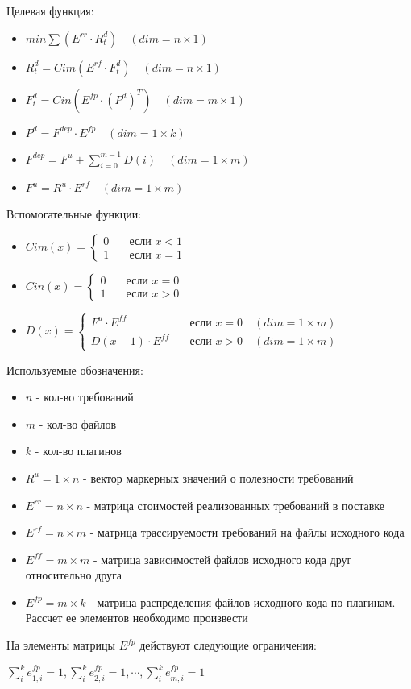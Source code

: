\documentclass{article}
\begin{document}
  \thispagestyle{empty}
  
  Целевая функция:
  \begin{itemize}
    \item[] $\displaystyle min \sum (E^{rr} \cdot R^{d}_{t}) \quad (dim = n \times 1)$
    \item[] $R^{d}_{t} = Cim(E^{rf} \cdot F^{d}_{t}) \quad (dim = n \times 1)$
    \item[] $F^{d}_{t} = Cin(E^{fp} \cdot (P^{d})^{T}) \quad (dim = m \times 1)$
    \item[] $P^{d} = F^{dep} \cdot E^{fp} \quad (dim = 1 \times k)$
    \item[] $\displaystyle F^{dep} = F^{u} + \sum^{m - 1}_{i = 0}D(i) \quad (dim = 1 \times m)$
    \item[] $F^{u} = R^{u} \cdot E^{rf} \quad (dim = 1 \times m)$
  \end{itemize}

  Вспомогательные функции:
  \begin{itemize}
    \item[] $
    Cim(x) = 
      \begin{cases}
        0 & \quad \text{если } x < 1 \\
        1 & \quad \text{если } x = 1
      \end{cases}
    $
    \item[] $
      Cin(x) =
      \begin{cases}
        0 & \quad \text{если } x = 0 \\
        1 & \quad \text{если } x > 0
      \end{cases}
    $
    \item[] $
      D(x) =
      \begin{cases}
        F^{u} \cdot E^{ff} & \quad \text{если } x = 0 \quad (dim = 1 \times m)\\
        D(x - 1) \cdot E^{ff} & \quad \text{если } x > 0 \quad (dim = 1 \times m)
      \end{cases}
    $
  \end{itemize}

  Используемые обозначения:
  \begin{itemize}
    \item[] $n$ - кол-во требований
    \item[] $m$ - кол-во файлов
    \item[] $k$ - кол-во плагинов
    \item[] $R^{u} = 1 \times n$ - вектор маркерных значений о полезности требований
    \item[] $E^{rr} = n \times n$ - матрица стоимостей реализованных требований в поставке
    \item[] $E^{rf} = n \times m$ - матрица трассируемости требований на файлы исходного кода
    \item[] $E^{ff} = m \times m$ - матрица зависимостей файлов исходного кода друг относительно друга
    \item[] $E^{fp} = m \times k$ - матрица распределения файлов исходного кода по плагинам. Рассчет ее элементов необходимо произвести
  \end{itemize}
  
  На элементы матрицы $E^{fp}$ действуют следующие ограничения:
  \begin{center}
    $\displaystyle \sum^{k}_{i}e^{fp}_{1, i} = 1, \sum^{k}_{i}e^{fp}_{2, i} = 1, \cdots, \sum^{k}_{i}e^{fp}_{m, i} = 1$
  \end{center}
\end{document}
